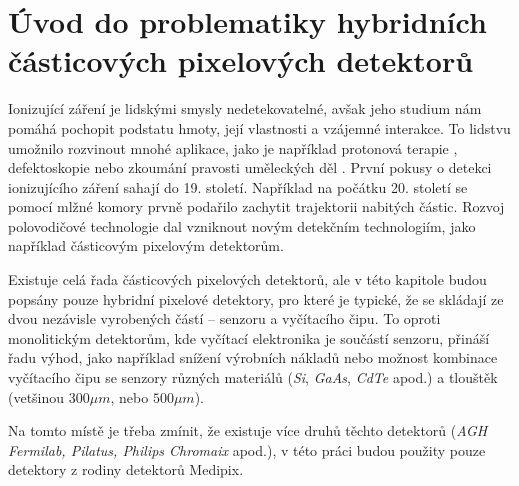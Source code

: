 

\chapter{Úvod do problematiky hybridních částicových pixelových detektorů}\label{chap:detectors}
Ionizující záření je lidskými smysly nedetekovatelné, avšak jeho studium nám pomáhá pochopit podstatu hmoty, její vlastnosti a vzájemné interakce. To lidstvu umožnilo rozvinout mnohé aplikace, jako je například protonová terapie \cite{tpx_app_radiotherapy}, defektoskopie nebo zkoumání pravosti uměleckých děl \cite{medipix_art}. První pokusy o detekci ionizujícího záření sahají do 19. století. Například na počátku 20. století se pomocí mlžné komory prvně podařilo zachytit trajektorii nabitých částic. Rozvoj polovodičové technologie dal vzniknout novým detekčním technologiím, jako například částicovým pixelovým detektorům.

Existuje celá řada částicových pixelových detektorů, ale v této kapitole budou popsány pouze hybridní pixelové detektory, pro které je typické, že se skládají ze dvou nezávisle vyrobených částí -- senzoru a vyčítacího čipu. To oproti monolitickým detektorům, kde vyčítací elektronika je součástí senzoru, přináší řadu výhod, jako například snížení výrobních nákladů nebo možnost kombinace vyčítacího čipu se senzory různých materiálů (\textit{Si}, \textit{GaAs}, \textit{CdTe} apod.) a tlouštěk (vetšinou $300\mu m$, nebo $500\mu m$).

Na tomto místě je třeba zmínit, že existuje více druhů těchto detektorů (\textit{AGH Fermilab, Pilatus, Philips Chromaix} apod.)\cite{detectors_review}, v této práci budou použity pouze detektory z rodiny detektorů Medipix.

